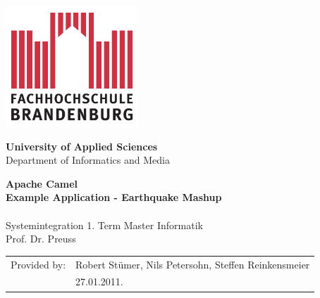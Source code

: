 \titlepage

\begin{center}
\includegraphics[width=5cm]{pics/FH-Logo}\vspace{0.5cm}

\par\end{center}

\noindent \begin{center}
\textsf{\textbf{\Large University of Applied Sciences}}\\
\textsf{\large Department of Informatics and Media}\\
\vspace{1cm}

\par\end{center}

\noindent \begin{center}
\textsf{\textbf{\huge Apache Camel  \\ Example Application -
Earthquake Mashup}}\textsf{}\\ \textsf{}\\
\textsf{\Large Systemintegration 1. Term Master Informatik \\ Prof.
Dr. Preuss }


\par\end{center}{\Large \par}

\vspace{2cm}


\noindent \begin{center}
{\huge }\begin{tabular}{rl}
Provided by: & Robert Stümer, Nils Petersohn, Steffen
Reinkensmeier\tabularnewline & 27.01.2011.\tabularnewline
\end{tabular}
\par\end{center}{\huge \par}

\vspace{1cm}




